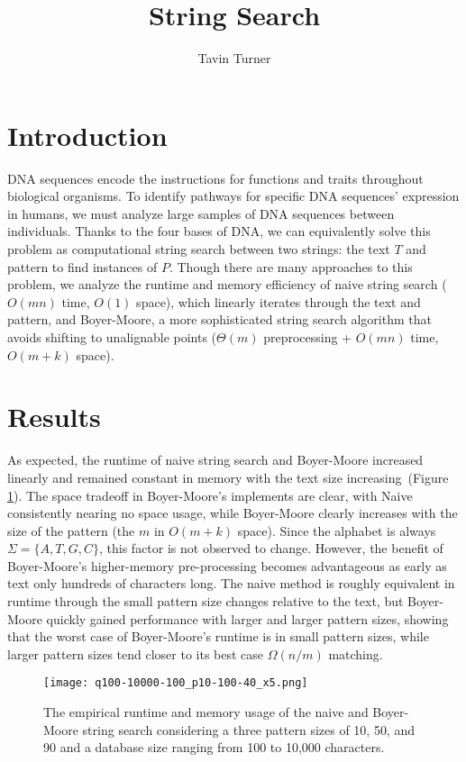 \documentclass[11pt, letterpaper]{article}
\begin{document}
\title{String Search}
\author{Tavin Turner}
\maketitle

\section{Introduction}
DNA sequences encode the instructions for functions and traits throughout biological organisms. To identify pathways for specific DNA sequences' expression in humans, we must analyze large samples of DNA sequences between individuals. Thanks to the four bases of DNA, we can equivalently solve this problem as computational string search between two strings: the text $T$ and pattern to find instances of $P$. Though there are many approaches to this problem, we analyze the runtime and memory efficiency of naive string search ($O(mn)$ time, $O(1)$ space), which linearly iterates through the text and pattern, and Boyer-Moore, a more sophisticated string search algorithm that avoids shifting to unalignable points ($\Theta(m)$ preprocessing + $O(mn)$ time, $O(m+k)$ space).

\section{Results}
As expected, the runtime of naive string search and Boyer-Moore increased linearly and remained constant in memory with the text size increasing~(Figure \ref{fig:timeandmem}). The space tradeoff in Boyer-Moore's implements are clear, with Naive consistently nearing no space usage, while Boyer-Moore clearly increases with the size of the pattern (the $m$ in $O(m+k)$ space). Since the alphabet is always $\Sigma=\{A,T,G,C\}$, this factor is not observed to change. However, the benefit of Boyer-Moore's higher-memory pre-processing becomes advantageous as early as text only hundreds of characters long. The naive method is roughly equivalent in runtime through the small pattern size changes relative to the text, but Boyer-Moore quickly gained performance with larger and larger pattern sizes, showing that the worst case of Boyer-Moore's runtime is in small pattern sizes, while larger pattern sizes tend closer to its best case $\Omega(n/m)$ matching.


\begin{figure}[h!] \centering
    \texttt{[image: q100-10000-100\_p10-100-40\_x5.png]}
    \caption{The empirical runtime and memory usage of the naive and Boyer-Moore string search considering a three pattern sizes of 10, 50, and 90 and a database size ranging from 100 to 10,000 characters.}
    \label{fig:timeandmem}
\end{figure}
\end{document}
